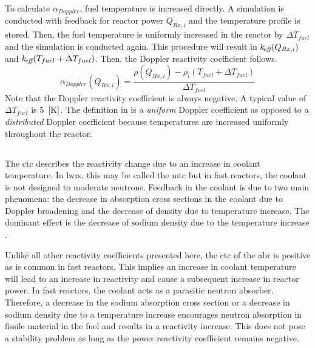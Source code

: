     To calculate $\alpha_{Doppler}$, fuel temperature is increased directly. A
    simulation is conducted with feedback for reactor power $Q_{Rx,i}$ and the
    temperature profile is stored. Then, the fuel temperature is uniformly 
    increased in the reactor by $\Delta T_{fuel}$ and the simulation is
    conducted again. This procedure will result in $k_{\!\mbox{\scriptsize \em eff}}(Q_{Rx,i})$ and
    ${k_{\!\mbox{\scriptsize \em eff}}(T_{fuel} + \Delta T_{fuel})}$. Then, the Doppler reactivity 
    coefficient follows.
    \begin{equation}
      \label{eq:doppler_reactivity_coefficient}
      \alpha_{Doppler}(Q_{Rx,i}) = \frac{\rho(Q_{Rx,i}) - \rho_i(T_{fuel} +
        \Delta T_{fuel})} {\Delta T_{fuel}}
    \end{equation}
    Note that the Doppler reactivity coefficient is always negative. A typical
    value of $\Delta T_{fuel}$ is $5~\left[\text{{K}}\right]$. The definition in
     is a \textit{uniform} Doppler
    coefficient as opposed to a \textit{distributed} Doppler coefficient because
    temperatures are increased uniformly throughout the reactor.

  \subsection{\texorpdfstring{}{Coolant Temperature
    Coefficient (CTC)}}
  \label{sec:coolant_temperature_reactivity_coefficient}
    The \gls{ctc} describes the reactivity change due to an increase in coolant
    temperature. In \glspl{lwr}, this may be called the \gls{mtc} but in fast
    reactors, the coolant is not designed to moderate neutrons. Feedback in the
    coolant is due to two main phenomena: the decrease in absorption cross
    sections in the coolant due to Doppler broadening and the decrease of
    density due to temperature increase. The dominant effect is the decrease of
    sodium density due to the temperature increase \cite{textbookknief}.

    Unlike all other reactivity coefficients presented here, the \gls{ctc} of
    the \gls{abr} is positive as is common in fast reactors. This implies an
    increase in coolant temperature will lead to an increase in reactivity and
    cause a subsequent increase in reactor power. In fast reactors, the coolant
    acts as a parasitic neutron absorber. Therefore, a decrease in the sodium
    absorption cross section or a decrease in sodium density due to a
    temperature increase encourages neutron absorption in fissile material in
    the fuel and results in a reactivity increase. This does not pose a 
    stability problem as long as the power reactivity coefficient remains 
    negative.


